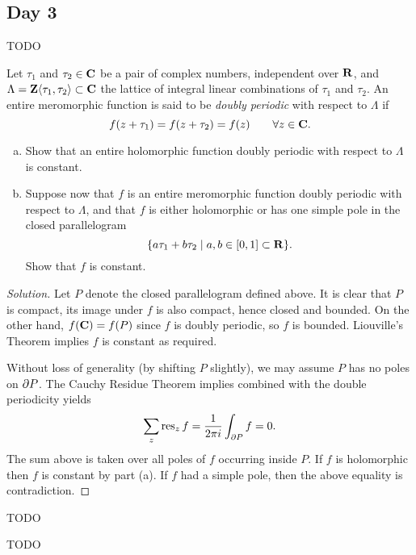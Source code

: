 \subsection{Day 3}
\label{S:fall-2009-3}
\mbox{}


TODO


Let $\tau_1$ and $\tau_2 \in \mathbf{C}$ be a pair of complex numbers, independent over $\mathbf{R}$, and $\Lambda = \mathbf{Z}\langle \tau_1, \tau_2 \rangle \subset \mathbf{C}$ the lattice of integral linear combinations of $\tau_1$ and $\tau_2$. An entire meromorphic function is said to be \emph{doubly periodic} with respect to $\Lambda$ if
\[
f(z + \tau_1) = f(z + \tau_2) = f(z) \qquad \forall z \in \mathbf{C}.
\]
\begin{enumerate}[(a)]
\item Show that an entire holomorphic function doubly periodic with respect to $\Lambda$ is constant.
\item Suppose now that $f$ is an entire meromorphic function doubly periodic with respect to $\Lambda$, and that $f$ is either holomorphic or has one simple pole in the closed parallelogram
  \[
  \{ a \tau_1 + b \tau_2 \;|\; a,b \in [0,1] \subset \mathbf{R} \}.
  \]
  Show that $f$ is constant.
\end{enumerate}

\begin{proof}[Solution]
  Let $P$ denote the closed parallelogram defined above. It is clear that $P$ is compact, its image under $f$ is also compact, hence closed and bounded. On the other hand, $f(\mathbf{C}) = f(P)$ since $f$ is doubly periodic, so $f$ is bounded. Liouville's Theorem implies $f$ is constant as required.

  Without loss of generality (by shifting $P$ slightly), we may assume $P$ has no poles on $\partial P$. The Cauchy Residue Theorem implies combined with the double periodicity yields
  \[
  \sum_z \operatorname{res}_z f = \frac{1}{2 \pi i} \int_{\partial P} f = 0.
  \]
  The sum above is taken over all poles of $f$ occurring inside $P$. If $f$ is holomorphic then $f$ is constant by part (a). If $f$ had a simple pole, then the above equality is contradiction.
\end{proof}


TODO


TODO


